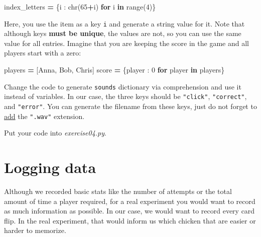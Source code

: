\documentclass[
]{book}
\newenvironment{Shaded}{\begin{snugshade}}{\end{snugshade}}
\newcommand{\BuiltInTok}[1]{#1}
\newcommand{\ControlFlowTok}[1]{\textcolor[rgb]{0.13,0.29,0.53}{\textbf{#1}}}
\newcommand{\DecValTok}[1]{\textcolor[rgb]{0.00,0.00,0.81}{#1}}
\newcommand{\KeywordTok}[1]{\textcolor[rgb]{0.13,0.29,0.53}{\textbf{#1}}}
\newcommand{\NormalTok}[1]{#1}
\newcommand{\OperatorTok}[1]{\textcolor[rgb]{0.81,0.36,0.00}{\textbf{#1}}}
\newcommand{\StringTok}[1]{\textcolor[rgb]{0.31,0.60,0.02}{#1}}
\begin{document}
\begin{Shaded}
\begin{Highlighting}[]
\NormalTok{index\_letters }\OperatorTok{=}\NormalTok{ \{i : }\BuiltInTok{chr}\NormalTok{(}\DecValTok{65}\OperatorTok{+}\NormalTok{i) }\ControlFlowTok{for}\NormalTok{ i }\KeywordTok{in} \BuiltInTok{range}\NormalTok{(}\DecValTok{4}\NormalTok{)\}}
\end{Highlighting}
\end{Shaded}

Here, you use the item as a key \texttt{i} and generate a string value for it. Note that although keys \textbf{must be unique}, the values are not, so you can use the same value for all entries. Imagine that you are keeping the score in the game and all players start with a zero:

\begin{Shaded}
\begin{Highlighting}[]
\NormalTok{players }\OperatorTok{=}\NormalTok{ [}\StringTok{\textquotesingle{}Anna\textquotesingle{}}\NormalTok{, }\StringTok{\textquotesingle{}Bob\textquotesingle{}}\NormalTok{, }\StringTok{\textquotesingle{}Chris\textquotesingle{}}\NormalTok{]}
\NormalTok{score }\OperatorTok{=}\NormalTok{ \{player : }\DecValTok{0} \ControlFlowTok{for}\NormalTok{ player }\KeywordTok{in}\NormalTok{ players\}}
\end{Highlighting}
\end{Shaded}

Change the code to generate \texttt{sounds} dictionary via comprehension and use it instead of variables. In our case, the three keys should be \texttt{"click"}, \texttt{"correct"}, and \texttt{"error"}. You can generate the filename from these keys, just do not forget to \href{https://www.w3schools.com/python/gloss_python_string_concatenation.asp}{add} the \texttt{".wav"} extension.

Put your code into \emph{exercise04.py}.

\hypertarget{logging-data}{%
\section{Logging data}\label{logging-data}}

Although we recorded basic stats like the number of attempts or the total amount of time a player required, for a real experiment you would want to record as much information as possible. In our case, we would want to record every card flip. In the real experiment, that would inform us which chicken that are easier or harder to memorize.
\end{document}
